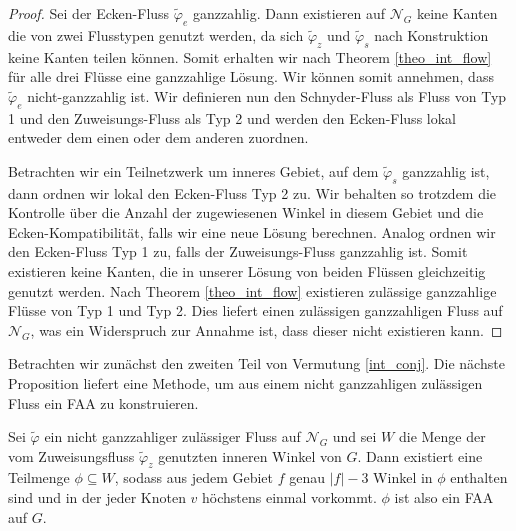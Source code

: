 \begin{proof}
Sei der Ecken-Fluss $\tilde{\varphi}_e$ ganzzahlig. Dann existieren auf $\mathcal{N}_G$ keine Kanten die von zwei Flusstypen genutzt werden, da sich $\tilde{\varphi}_z$ und $\tilde{\varphi}_s$ nach Konstruktion keine Kanten teilen können. Somit erhalten wir nach Theorem \ref{theo_int_flow} für alle drei Flüsse eine ganzzahlige Lösung. Wir können somit annehmen, dass $\tilde{\varphi}_e$ nicht-ganzzahlig ist. Wir definieren nun den Schnyder-Fluss als Fluss von Typ 1 und den Zuweisungs-Fluss als Typ 2 und werden den Ecken-Fluss lokal entweder dem einen oder dem anderen zuordnen. 

Betrachten wir ein Teilnetzwerk um inneres Gebiet, auf dem $\tilde{\varphi}_s$ ganzzahlig ist, dann ordnen wir lokal den Ecken-Fluss Typ 2 zu. Wir behalten so trotzdem die Kontrolle über die Anzahl der zugewiesenen Winkel in diesem Gebiet und die Ecken-Kompatibilität, falls wir eine neue Lösung berechnen. Analog ordnen wir den Ecken-Fluss Typ 1 zu, falls der Zuweisungs-Fluss ganzzahlig ist. Somit existieren keine Kanten, die in unserer Lösung von beiden Flüssen gleichzeitig genutzt werden. Nach Theorem \ref{theo_int_flow} existieren zulässige ganzzahlige Flüsse von Typ 1 und Typ 2. Dies liefert einen zulässigen ganzzahligen Fluss auf $\mathcal{N}_G$, was ein Widerspruch zur Annahme ist, dass dieser nicht existieren kann.
\end{proof}

Betrachten wir zunächst den zweiten Teil von Vermutung \ref{int_conj}. Die nächste Proposition liefert eine Methode, um aus einem nicht ganzzahligen zulässigen Fluss ein FAA zu konstruieren.

\begin{proposition}\label{lem_faa}
Sei $\tilde{\varphi}$ ein nicht ganzzahliger zulässiger Fluss auf $\mathcal{N}_G$ und sei $W$ die Menge der vom Zuweisungsfluss $\tilde{\varphi}_z$ genutzten inneren Winkel von $G$. Dann existiert eine Teilmenge $\phi\subseteq W$, sodass aus jedem Gebiet $f$ genau $|f|-3$ Winkel in $\phi$ enthalten sind und in der jeder Knoten $v$ höchstens einmal vorkommt. $\phi$ ist also ein FAA auf $G$.
\end{proposition}

